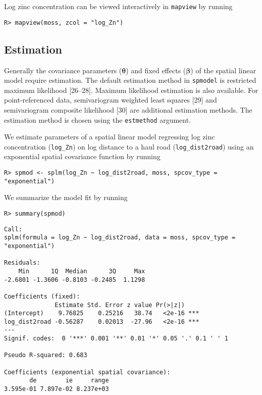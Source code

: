 \documentclass[10pt,letterpaper]{article}
\begin{document}
\noindent Log zinc concentration can be viewed interactively in
\texttt{mapview} by running

\begin{verbatim}
R> mapview(moss, zcol = "log_Zn")
\end{verbatim}

\hypertarget{estimation}{%
\subsection{Estimation}\label{estimation}}

Generally the covariance parameters (\(\boldsymbol{\theta}\)) and fixed
effects (\(\boldsymbol{\beta}\)) of the spatial linear model require
estimation. The default estimation method in \texttt{spmodel} is
restricted maximum likelihood {[}26--28{]}. Maximum likelihood
estimation is also available. For point-referenced data, semivariogram
weighted least squares {[}29{]} and semivariogram composite likelihood
{[}30{]} are additional estimation methods. The estimation method is
chosen using the \texttt{estmethod} argument.

We estimate parameters of a spatial linear model regressing log zinc
concentration (\texttt{log\_Zn}) on log distance to a haul road
(\texttt{log\_dist2road}) using an exponential spatial covariance
function by running

\begin{verbatim}
R> spmod <- splm(log_Zn ~ log_dist2road, moss, spcov_type = "exponential")
\end{verbatim}

\noindent We summarize the model fit by running

\begin{verbatim}
R> summary(spmod)
\end{verbatim}

\begin{verbatim}
Call:
splm(formula = log_Zn ~ log_dist2road, data = moss, spcov_type = "exponential")

Residuals:
    Min      1Q  Median      3Q     Max 
-2.6801 -1.3606 -0.8103 -0.2485  1.1298 

Coefficients (fixed):
              Estimate Std. Error z value Pr(>|z|)    
(Intercept)    9.76825    0.25216   38.74   <2e-16 ***
log_dist2road -0.56287    0.02013  -27.96   <2e-16 ***
---
Signif. codes:  0 '***' 0.001 '**' 0.01 '*' 0.05 '.' 0.1 ' ' 1

Pseudo R-squared: 0.683

Coefficients (exponential spatial covariance):
       de        ie     range 
3.595e-01 7.897e-02 8.237e+03 
\end{verbatim}
\end{document}
